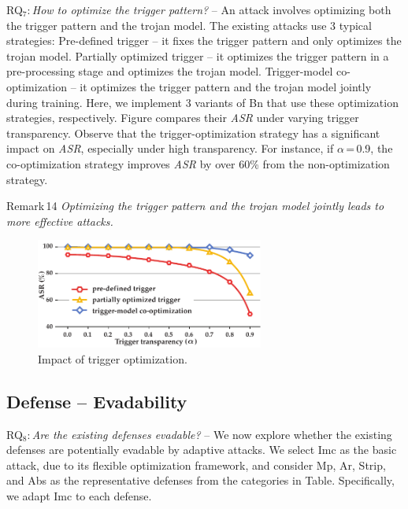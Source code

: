 \documentclass[compsoc,conference,a4paper,10pt,times]{IEEEtran}
\newcommand{\bn}{{\sc Bn}\xspace}
\newcommand{\imc}{{\sc Imc}\xspace}
\newcommand{\asr}{{\em \small ASR}\xspace}
\newcommand{\abs}{{\sc Abs}\xspace}
\newcommand{\strip}{{\sc Strip}\xspace}
\newcommand{\at}{{\sc Ar}\xspace}
\newcommand{\mmp}{{\sc Mp}\xspace}
\begin{document}
\vspace{2pt}
{RQ$_7$:\,{\em How to optimize the trigger pattern?}} -- An attack involves optimizing both the trigger pattern and the trojan model. The existing attacks use 3 typical strategies:  Pre-defined trigger -- it fixes the trigger pattern and only optimizes the trojan model. 
 Partially optimized trigger -- it optimizes the trigger pattern in a pre-processing stage and optimizes the trojan model.  Trigger-model co-optimization -- it optimizes the trigger pattern and the trojan model jointly during training. Here, we implement 3 variants of \bn that use these optimization strategies, respectively. Figure compares their \asr under varying trigger transparency. Observe that the trigger-optimization strategy has a significant impact on \asr, especially under high transparency. For instance, if $\alpha$\,=\,0.9, the co-optimization strategy improves \asr by over 60\% from the non-optimization strategy.
\begin{mtbox}{\small Remark\,14}
    {\em \small Optimizing the trigger pattern and the trojan model jointly leads to more effective attacks.}
\end{mtbox}


\begin{figure}[!ht]
    \centering
    \includegraphics[width=75mm]{figures/optimization.pdf}
    \caption{Impact of trigger optimization. \label{fig:optim_term}}
\end{figure}



    
\subsection{Defense -- Evadability}

{RQ$_8$:\,{\em Are the existing defenses evadable?}} -- We now explore whether the existing defenses are potentially evadable by adaptive attacks. We select \imc as the basic attack, due to its flexible optimization framework, and consider \mmp, \at, \strip, and \abs as the representative defenses from the categories in Table. Specifically, we adapt \imc to each defense.
\end{document}
